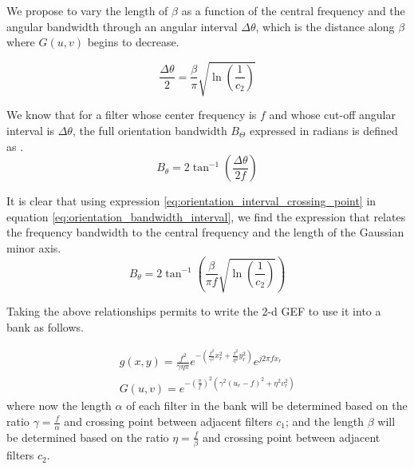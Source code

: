 We propose to vary the length of $\beta$ as a function of the central frequency and the angular bandwidth through an angular interval $\Delta \theta$, which is the distance along $\beta$ where $G(u, v)$ begins to decrease.

\begin{equation}\label{eq:orientation_interval_crossing_point}
    \frac{\Delta \theta}{2} = \frac{\beta}{\pi}\sqrt{\ln \left(\frac{1}{c_2}\right)}
\end{equation}

We know that for a filter whose center frequency is $f$ and whose cut-off angular interval is $\Delta \theta$, the full orientation bandwidth $B_\Theta$ expressed in radians is defined as \citep{Daugman:JOSA:1985a}.
\begin{equation}\label{eq:orientation_bandwidth_interval}
    B_{\theta} = 2 \tan^{-1} \left( \frac{\Delta \theta}{2f} \right)
\end{equation}

It is clear that using expression \eqref{eq:orientation_interval_crossing_point} in equation \eqref{eq:orientation_bandwidth_interval}, we find the expression that relates the frequency bandwidth to the central frequency and the length of the Gaussian minor axis.
\begin{equation}\label{eq:orientation_bandwidth}
    B_{\theta} = 2 \tan^{-1} \left( \frac{\beta}{\pi f} \sqrt{\ln \left(\frac{1}{c_2}\right)} \right)
\end{equation}

Taking the above relationships permits to write the 2-d GEF to use it into a bank as follows. 

\begin{equation}\label{eq:gabor_function_2d_spacefreq_bank}
    \begin{gathered}
         g(x,y) =  \frac{f^2}{\gamma \eta \pi} e ^{-\left(\frac{f^2}{\gamma^2} x_r^2 + \frac{f^2}{\eta^2} y_r^2\right)} e ^{j 2 \pi f x_r } \\
         G(u,v) =  e ^{-\left(\frac{\pi}{f}\right)^2\left( \gamma^2 (u_r-f)^2 + \eta^2 v_r^2\right)}
     \end{gathered}
\end{equation}
where now the length $\alpha$ of each filter in the bank will be determined based on the ratio $\gamma = \frac{f}{\alpha}$ and crossing point between adjacent filters $c_1$; and the length $\beta$ will be determined based on the ratio $\eta = \frac{f}{\beta}$ and crossing point between adjacent filters $c_2$.

